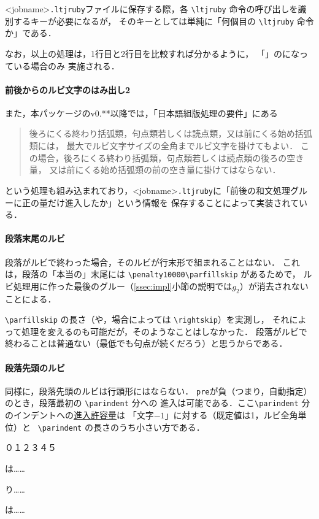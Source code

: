\documentclass[a4paper,10ptj]{ltjsarticle}
\def\emph#1{\textbf{\textgt{#1}}}
\begin{document}
<jobname>\texttt{.ltjruby}ファイルに保存する際，各 \verb+\ltjruby+ 命令の呼び出しを識別するキーが必要になるが，
そのキーとしては単純に「何個目の \verb+\ltjruby+ 命令か」である．

なお，以上の処理は，1行目と2行目を比較すれば分かるように，
「」の\emph{\underline{前文字進入許容量}指定(\texttt{pre})が自動}になっている場合のみ
実施される．


\paragraph{前後からのルビ文字のはみ出し2}
また，本パッケージのv0.**以降では，「日本語組版処理の要件」にある
\begin{quote}
  後ろにくる終わり括弧類，句点類若しくは読点類，又は前にくる始め括弧類には，
  最大でルビ文字サイズの全角までルビ文字を掛けてもよい．
  この場合，後ろにくる終わり括弧類，句点類若しくは読点類の後ろの空き量，
  又は前にくる始め括弧類の前の空き量に掛けてはならない．
\end{quote}
という処理も組み込まれており，<jobname>\texttt{.ltjruby}に「前後の和文処理グルーに正の量だけ進入したか」という情報を
保存することによって実装されている．

\paragraph{段落末尾のルビ}
段落がルビで終わった場合，そのルビが行末形で組まれることはない．
これは，段落の「本当の」末尾には \verb+\penalty10000\parfillskip+ があるためで，
ルビ処理用に作った最後のグルー（\ref{ssec:impl}\nobreak 小節の説明では$g_2$）が消去されないことによる．

\verb+\parfillskip+ の長さ（や，場合によっては \verb+\rightskip+）を実測し，
それによって処理を変えるのも可能だが，そのようなことはしなかった．
段落がルビで終わることは普通ない（最低でも句点が続くだろう）と思うからである．

\paragraph{段落先頭のルビ}
同様に，段落先頭のルビは行頭形にはならない．
\texttt{pre}が負（つまり，自動指定）のとき，段落最初の \verb+\parindent+ 分への
進入は可能である．ここ\verb+\parindent+ 分のインデントへの\underline{進入許容量}は
「文字$-1$」に対する（既定値は1，ルビ全角単位）と
\ \verb+\parindent+ の長さのうち小さい方である．
\begin{LTXexample}[preset=\Large,width=0.4\textwidth]
\zw\noindent ０１２３４５\par
{}は……\par
{}り……\par
{}\zw{}は……
\end{LTXexample}
\end{document}

